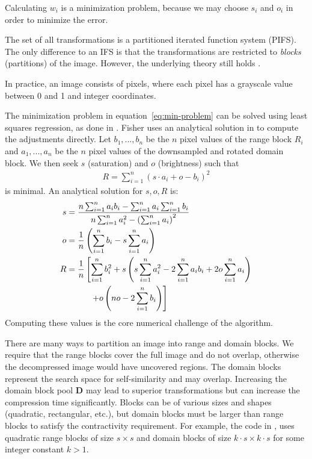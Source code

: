 Calculating $w_i$ is a minimization problem, because we may choose $s_i$ and
$o_i$ in order to minimize the error.

The set of all transformations is a partitioned iterated function system (PIFS).
The only difference to an IFS is that the transformations are restricted to
\textit{blocks} (partitions) of the image. However, the underlying theory still
holds \cite{fisher2012}.

\label{par-practical-implementation}
In practice, an image consists of pixels, where each pixel has a grayscale value between 0 and 1 and integer coordinates.

The minimization problem in equation~\eqref{eq:min-problem} can be solved using least squares regression, as done in \cite{github-python}.
Fisher uses an analytical solution in \cite{fisher2012} to compute the adjustments directly. Let $b_1, ..., b_n$ be the $n$ pixel values of the range block $R_i$
and $a_1,...,a_n$ be the $n$ pixel values of the downsampled and rotated domain block. We then seek $s$ (saturation) and $o$ (brightness) such that
\begin{align*}
  R = \sum_{i=1}^n (s \cdot a_i + o - b_i)^2
\end{align*}
is minimal. An analytical solution for $s,o,R$ is:
\begin{align}
    s &= \frac{n \sum_{i=1}^n a_i b_i - \sum_{i=1}^n a_i \sum_{i=1}^n b_i}{n \sum_{i=1}^n a_i^2 - \left(\sum_{i=1}^n a_i \right)^2} \label{contrast}\\
    o &= \frac{1}{n} \left( \sum_{i=1}^n b_i - s \sum_{i=1}^n a_i \right) \label{brightness}\\
    R &= \frac{1}{n} \left[ \sum_{i=1}^n b_i^2 + s \left( s \sum_{i=1}^n a_i^2 - 2 \sum_{i=1}^n a_i b_i + 2o \sum_{i=1}^n a_i \right) \right. \notag\\
    &\text{\hspace{1cm}} \left. + o \left(no - 2 \sum_{i=1}^n b_i \right)  \right]\label{error}
\end{align}
Computing these values is the core numerical challenge of the algorithm.

 There are many ways to partition an image into range
and domain blocks. We require that the range blocks cover the full image and do
not overlap, otherwise the decompressed image would have uncovered regions. The
domain blocks represent the search space for self-similarity and may overlap.
Increasing the domain block pool $\boldsymbol{D}$ may lead to superior
transformations but can increase the compression time significantly. Blocks can
be of various sizes and shapes (quadratic, rectangular, etc.), but domain blocks
must be larger than range blocks to satisfy the contractivity requirement. For
example, the code in \cite{github-python}, uses quadratic range blocks of size
$s \times s$ and domain blocks of size $k\cdot s \times k \cdot s$ for some
integer constant $k > 1$.

